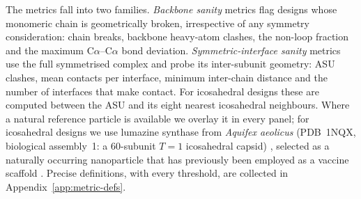 The metrics fall into two families. \emph{Backbone sanity} metrics flag designs
whose monomeric chain is geometrically broken, irrespective of any symmetry
consideration: chain breaks, backbone heavy-atom clashes, the non-loop fraction
and the maximum C$\alpha$--C$\alpha$ bond deviation. \emph{Symmetric-interface
sanity} metrics use the full symmetrised complex and probe its inter-subunit
geometry: ASU clashes, mean contacts per interface, minimum inter-chain distance
and the number of interfaces that make contact. For icosahedral designs these are
computed between the ASU and its eight nearest icosahedral neighbours. Where a
natural reference particle is available we overlay it in every panel; for
icosahedral designs we use lumazine synthase from \emph{Aquifex aeolicus}
(PDB~1NQX, biological assembly~1: a 60-subunit $T{=}1$ icosahedral capsid)
\parencite{zhangStructurebasedModelReaction2003}, selected as a naturally occurring
nanoparticle that has previously been employed as a vaccine scaffold
\parencite{ladenstein_second_2020,joseph_lumazine_2025}. Precise definitions, with
every threshold, are collected in Appendix~\ref{app:metric-defs}.
